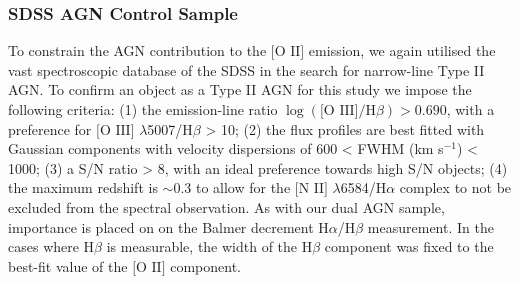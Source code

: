 \subsubsection{SDSS AGN Control Sample}

To constrain the AGN contribution to the $\text{[O II]}$ emission, we again utilised the vast spectroscopic database of the SDSS in the search for narrow-line Type II AGN. To confirm an object as a Type II AGN for this study we impose the following criteria: (1) the emission-line ratio $\log(\text{[O III]}/\text{H}\beta)>{0.690}$, with a preference for $\text{[O III]}$ $\lambda$5007/$\text{H}\beta$ > 10; (2) the flux profiles are best fitted with Gaussian components with velocity dispersions of 600 < FWHM (km s$^{-1}$) < 1000; (3) a S/N ratio > 8, with an ideal preference towards high S/N objects; (4) the maximum redshift is $\sim{0.3}$ to allow for the $\text{[N II]}$ $\lambda$6584/$\text{H}\alpha$ complex to not be excluded from the spectral observation. As with our dual AGN sample, importance is placed on on the Balmer decrement $\text{H}\alpha$/$\text{H}\beta$ measurement. In the cases where $\text{H}\beta$ is measurable, the width of the $\text{H}\beta$ component was fixed to the best-fit value of the $\text{[O II]}$ component.
  
  